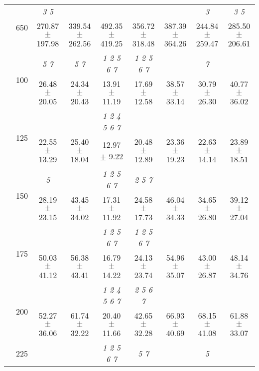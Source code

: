 \begin{table}[h]
{\begin{tabular}{
        ccccccccc}
 & \multirow{2}{*}{650}& \textit{ 3 5 }& & & & & \textit{ 3 }& \textit{ 3 5 } \\ 
 & & 270.87 $\pm$ 197.98& 339.54 $\pm$ 262.56& 492.35 $\pm$ 419.25& 356.72 $\pm$ 318.48& 387.39 $\pm$ 364.26& 244.84 $\pm$ 259.47& 285.50 $\pm$ 206.61 \\ \midrule 
 & \multirow{2}{*}{100}& \textit{ 5 7 }& \textit{ 5 7 }& \textit{ 1 2 5 6 7 }& \textit{ 1 2 5 6 7 }& & \textit{ 7 }&  \\ 
 & & 26.48 $\pm$ 20.05& 24.34 $\pm$ 20.43& 13.91 $\pm$ 11.19& 17.69 $\pm$ 12.58& 38.57 $\pm$ 33.14& 30.79 $\pm$ 26.30& 40.77 $\pm$ 36.02 \\ 
 & \multirow{2}{*}{125}& \cellcolor[HTML]{EFEFEF} & \cellcolor[HTML]{EFEFEF} & \cellcolor[HTML]{EFEFEF} \textit{ 1 2 4 5 6 7 }& \cellcolor[HTML]{EFEFEF} & \cellcolor[HTML]{EFEFEF} & \cellcolor[HTML]{EFEFEF} & \cellcolor[HTML]{EFEFEF}  \\ 
 & & \cellcolor[HTML]{EFEFEF} 22.55 $\pm$ 13.29& \cellcolor[HTML]{EFEFEF} 25.40 $\pm$ 18.04& \cellcolor[HTML]{EFEFEF} 12.97 $\pm$ 9.22& \cellcolor[HTML]{EFEFEF} 20.48 $\pm$ 12.89& \cellcolor[HTML]{EFEFEF} 23.36 $\pm$ 19.23& \cellcolor[HTML]{EFEFEF} 22.63 $\pm$ 14.14& \cellcolor[HTML]{EFEFEF} 23.89 $\pm$ 18.51 \\ 
 & \multirow{2}{*}{150}& \textit{ 5 }& & \textit{ 1 2 5 6 7 }& \textit{ 2 5 7 }& & &  \\ 
 & & 28.19 $\pm$ 23.15& 43.45 $\pm$ 34.02& 17.31 $\pm$ 11.92& 24.58 $\pm$ 17.73& 46.04 $\pm$ 34.33& 34.65 $\pm$ 26.80& 39.12 $\pm$ 27.04 \\ 
 & \multirow{2}{*}{175}& \cellcolor[HTML]{EFEFEF} & \cellcolor[HTML]{EFEFEF} & \cellcolor[HTML]{EFEFEF} \textit{ 1 2 5 6 7 }& \cellcolor[HTML]{EFEFEF} \textit{ 1 2 5 6 7 }& \cellcolor[HTML]{EFEFEF} & \cellcolor[HTML]{EFEFEF} & \cellcolor[HTML]{EFEFEF}  \\ 
 & & \cellcolor[HTML]{EFEFEF} 50.03 $\pm$ 41.12& \cellcolor[HTML]{EFEFEF} 56.38 $\pm$ 43.41& \cellcolor[HTML]{EFEFEF} 16.79 $\pm$ 14.22& \cellcolor[HTML]{EFEFEF} 24.13 $\pm$ 23.74& \cellcolor[HTML]{EFEFEF} 54.96 $\pm$ 35.07& \cellcolor[HTML]{EFEFEF} 43.00 $\pm$ 26.87& \cellcolor[HTML]{EFEFEF} 48.14 $\pm$ 34.76 \\ 
 & \multirow{2}{*}{200}& & & \textit{ 1 2 4 5 6 7 }& \textit{ 2 5 6 7 }& & &  \\ 
 & & 52.27 $\pm$ 36.06& 61.74 $\pm$ 32.22& 20.40 $\pm$ 11.66& 42.65 $\pm$ 32.28& 66.93 $\pm$ 40.69& 68.15 $\pm$ 41.08& 61.88 $\pm$ 33.07 \\ 
 & \multirow{2}{*}{225}& \cellcolor[HTML]{EFEFEF} & \cellcolor[HTML]{EFEFEF} & \cellcolor[HTML]{EFEFEF} \textit{ 1 2 5 6 7 }& \cellcolor[HTML]{EFEFEF} \textit{ 5 7 }& \cellcolor[HTML]{EFEFEF} & \cellcolor[HTML]{EFEFEF} \textit{ 5 }& \cellcolor[HTML]{EFEFEF}  \\ 

\end{tabular}}
\end{table}
